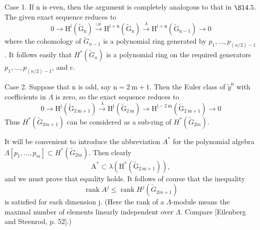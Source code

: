 \documentclass[10pt]{article}
\begin{document}
Case 1. If $\mathrm{n}$ is even, then the argument is completely analogous to that in $\S 14.5$. The given exact sequence reduces to
$$
0 \longrightarrow \mathrm{H}^{\mathrm{i}}\left(\widetilde{\mathrm{G}}_{\mathrm{n}}\right) \stackrel{\cup \mathrm{e}}{\longrightarrow} \mathrm{H}^{\mathrm{i}+\mathrm{n}}\left(\widetilde{\mathrm{G}}_{\mathrm{n}}\right) \stackrel{\lambda}{\longrightarrow} \mathrm{H}^{\mathrm{i}+\mathrm{n}}\left(\widetilde{\mathrm{G}}_{\mathrm{n}-1}\right) \longrightarrow 0
$$
where the cohomology of $\widetilde{G}_{n-1}$ is a polynomial ring generated by $p_{1}, \ldots, p_{(n / 2)-1}$. It follows easily that $H^{*}\left(\widetilde{G}_{n}\right)$ is a polynomial ring on the required generators $p_{1}, \ldots, p_{(n / 2)-1}$, and $e$.

Case 2. Suppose that $\mathrm{n}$ is odd, say $\mathrm{n}=2 \mathrm{~m}+1$. Then the Euler class of $\widetilde{y}^{\mathrm{n}}$ with coefficients in $\Lambda$ is zero, so the exact sequence reduces to
$$
0 \longrightarrow \mathrm{H}^{\mathrm{j}}\left(\widetilde{\mathrm{G}}_{2 \mathrm{~m}+1}\right) \stackrel{\lambda}{\longrightarrow} \mathrm{H}^{\mathrm{j}}\left(\widetilde{\mathrm{G}}_{2 \mathrm{~m}}\right) \longrightarrow \mathrm{H}^{\mathrm{j}-2 \mathrm{~m}}\left(\widetilde{\mathrm{G}}_{2 \mathrm{~m}+1}\right) \longrightarrow 0
$$
Thus $H^{*}\left(\widetilde{G}_{2 m+1}\right)$ can be considered as a sub-ring of $H^{*}\left(\widetilde{G}_{2 m}\right)$.

It will be convenient to introduce the abbreviation $A^{*}$ for the polynomial algebra $\Lambda\left[p_{1}, \ldots, p_{m}\right] \subset H^{*}\left(\widetilde{G}_{2 m}\right)$. Then clearly
$$
\mathrm{A}^{*} \subset \lambda\left(\mathrm{H}^{*}\left(\widetilde{\mathrm{G}}_{2 \mathrm{~m}+1}\right)\right),
$$
and we must prove that equality holds. It follows of course that the inequality
$$
\operatorname{rank} A^{j} \leq \operatorname{rank} H^{j}\left(\widetilde{G}_{2 m+1}\right)
$$
is satisfied for each dimension $\mathrm{j}$. (Here the rank of a $\Lambda$-module means the maximal number of elements linearly independent over $\Lambda$. Compare [Eilenberg and Steenrod, p. 52].)
\end{document}
